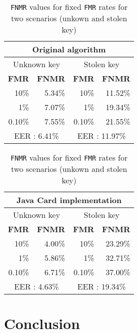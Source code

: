 \documentclass[a4paper,12pt]{article}
\begin{document}
\begin{table}[htbp]
\begin{minipage}[b]{0.45\linewidth}
  \centering
    \begin{tabular}{rrrr}
    \multicolumn{4}{c}{Original algorithm}\\
    \toprule
    \multicolumn{2}{c}{Unknown key} & \multicolumn{2}{c}{Stolen key} \\
    
    \textbf{FMR} & \textbf{FNMR} & \textbf{FMR} & \textbf{FNMR} \\
\midrule    
    10\%  & 5.34\% & 10\%  & 11.52\% \\
    1\%   & 7.07\% & 1\%   & 19.34\% \\
    0.10\% & 7.55\% & 0.10\% & 21.55\% \\
    \bottomrule
    \multicolumn{2}{c}{EER : 6.41\%} & \multicolumn{2}{c}{EER : 11.97\%} \\
    \end{tabular}%
\end{minipage}
	\hspace{0.5cm}
\begin{minipage}[b]{0.45\linewidth}
  \centering
    \begin{tabular}{rrrr}
     \multicolumn{4}{c}{Java Card implementation}\\
    \toprule
    \multicolumn{2}{c}{Unknown key} & \multicolumn{2}{c}{Stolen key} \\
    
    \textbf{FMR} & \textbf{FNMR} & \textbf{FMR} & \textbf{FNMR} \\
\midrule    
    10\%  & 4.00\% & 10\%  & 23.29\% \\
    1\%   & 5.86\% & 1\%   & 32.71\% \\
    0.10\% & 6.71\% & 0.10\% & 37.00\% \\
    \bottomrule
        \multicolumn{2}{c}{EER : 4.63\%} & \multicolumn{2}{c}{EER : 19.34\%} \\

    \end{tabular}%
  
  	
  \end{minipage}
  
  \caption{\texttt{FNMR} values for fixed \texttt{FMR} rates for two scenarios (unkown and stolen key)}
  \label{eer}%
\end{table}%

\newpage
\section{Conclusion}
\end{document}
